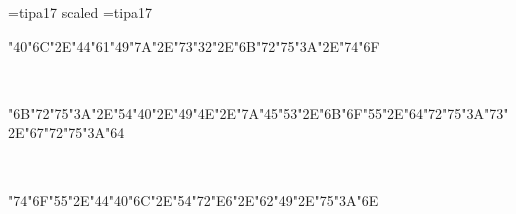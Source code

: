 \font\ipa=tipa17 scaled  \font\acc=tipa17
\def\tl#1{{\acc\accent"00 #1}}
\def\tm#1{{\acc\accent"09 #1}}
\def\u#1{{\acc\accent"08 #1}}
\def\th#1{{\acc\accent"01 #1}}
\def\thh#1{{\acc\accent"05 #1}}
\def\tll#1{{\acc\accent"0D #1}}
\null\vfill
\centerline{\ipa\char"40\ipa\char"6C\ipa\char"2E\ipa\char"44\ipa\char"61\ipa\char"49\ipa\char"7A\ipa\char"2E\ipa\char"73\ipa\char"32\ipa\char"2E\ipa\char"6B\ipa\char"72\ipa\char"75\ipa\char"3A\ipa\char"2E\ipa\char"74\ipa\char"6F}\

\centerline{\ipa\char"6B\ipa\char"72\ipa\char"75\ipa\char"3A\ipa\char"2E\ipa\char"54\ipa\char"40\ipa\char"2E\ipa\char"49\ipa\char"4E\ipa\char"2E\ipa\char"7A\ipa\char"45\ipa\char"53\ipa\char"2E\ipa\char"6B\ipa\char"6F\ipa\char"55\ipa\char"2E\ipa\char"64\ipa\char"72\ipa\char"75\ipa\char"3A\ipa\char"73\ipa\char"2E\ipa\char"67\ipa\char"72\ipa\char"75\ipa\char"3A\ipa\char"64}\

\centerline{\ipa\char"74\ipa\char"6F\ipa\char"55\ipa\char"2E\ipa\char"44\ipa\char"40\ipa\char"6C\ipa\char"2E\ipa\char"54\ipa\char"72\ipa\char"E6\ipa\char"2E\ipa\char"62\ipa\char"49\ipa\char"2E\ipa\char"75\ipa\char"3A\ipa\char"6E}\bye